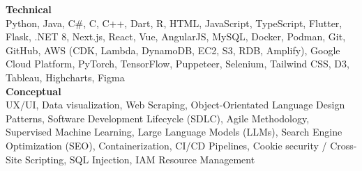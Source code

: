 \textbf{Technical}\\
Python, Java, C#, C, C++, Dart, R, HTML, JavaScript, TypeScript, Flutter, Flask, .NET 8, Next.js, React, Vue, AngularJS, MySQL, Docker, Podman, Git, GitHub, AWS (CDK, Lambda, DynamoDB, EC2, S3, RDB, Amplify), Google Cloud Platform, PyTorch, TensorFlow, Puppeteer, Selenium, Tailwind CSS, D3, Tableau, Highcharts, Figma\\
\textbf{Conceptual}\\
UX/UI, Data visualization, Web Scraping, Object-Orientated Language Design Patterns, Software Development Lifecycle (SDLC), Agile Methodology, Supervised Machine Learning, Large Language Models (LLMs), Search Engine Optimization (SEO), Containerization, CI/CD Pipelines, Cookie security / Cross-Site Scripting, SQL Injection, IAM Resource Management\\